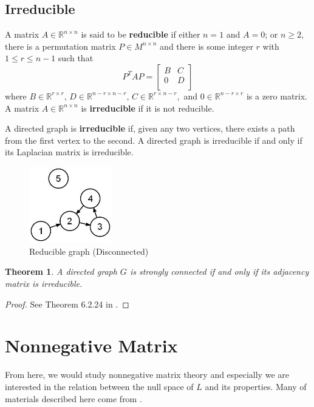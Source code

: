 \documentclass[11pt, a4paper, oneside, openany, reqno]{book}
\newtheorem{theorem}{Theorem}[chapter]
\theoremstyle{definition}
\theoremstyle{remark}
\numberwithin{equation}{chapter} %
\newcommand{\R}{\ensuremath{{\mathbb R}}}
\begin{document}
\subsection{Irreducible}

A matrix $ A \in \R^{n \times n} $ is said to be \textbf{reducible} if either
$ n=1 $ and $ A=0 $; or $ n \geq 2$, there is a permutation matrix $ P \in M^{n \times n} $ 
and there is some integer $ r $ with $ 1 \leq r \leq n-1 $ such that
\[ P^T A P =\left[ \begin{array}{cc}
B & C\\ 0 & D \\\end{array} \right] \]
where $ B \in \R^{r \times r},\, D \in \R^{n-r \times n-r},\,C \in \R^{r \times n-r}, $ 
and $ 0 \in \R^{n-r \times r} $ is a zero matrix.
A matrix $ A \in \R^{n \times n} $ is \textbf{irreducible} if it is not reducible.

A directed graph is \textbf{irreducible} if, given any two vertices, 
there exists a path from the first vertex to the second.
A directed graph is irreducible if and only if its Laplacian matrix is irreducible.

\begin{figure}[htp]
	\centering
	\includegraphics[width=0.32\textwidth]{graph3.png}
	\caption{Reducible graph (Disconnected)}\label{redugraph}
\end{figure}

\begin{theorem}
	A directed graph $ G $ is strongly connected 
	if and only if its adjacency matrix is irreducible.
\end{theorem}
\begin{proof}
	See Theorem 6.2.24 in \cite{horn}.
\end{proof}


\section{Nonnegative Matrix}
From here, we would study nonnegative matrix theory 
and especially we are interested in the relation between the null space of $ L $ and its properties.
Many of materials described here come from \cite{horn}.
\end{document}
